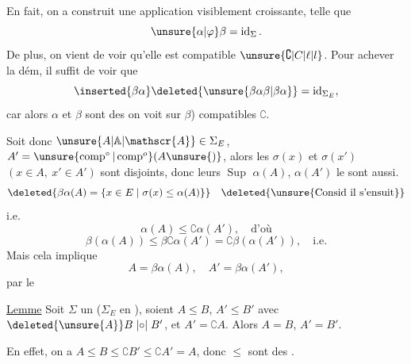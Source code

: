 En fait, on a  construit une application
visiblement croissante, telle que
\[
\unsure{\alpha|\varphi}\beta=\operatorname{id}_{\Sigma}.
\]
De plus, on vient de voir qu'elle est compatible  $\unsure{\complement|C|\ell|l}$. Pour achever la dém, il suffit de voir que
\[
\inserted{\beta\alpha}\deleted{\unsure{\beta\alpha\beta|\beta\alpha}}=\operatorname{id}_{\Sigma_E},
\]
car alors $\alpha$ et $\beta$ sont des   on voit sur $\beta$) compatibles  $\complement$.

Soit donc $\unsure{A|\mathbb{A}|\mathscr{A}}\in\Sigma_E$, $A'=\unsure{\operatorname{comp}^{\circ}|\operatorname{comp}^{o}}(A\unsure{)}$, alors les $\sigma(x)$ et $\sigma(x')$ $(x\in A,\ x'\in A')$ sont disjoints, donc leurs $\operatorname{Sup}$ $\alpha(A)$, $\alpha(A')$ le sont aussi. 
\[
\deleted{\beta\alpha(A)=\{x\in E\mid\sigma(x)\leq\alpha(A)\}}
\quad\deleted{\text{\unsure{Consid il s'ensuit}}}
\]
i.e.
\[
\alpha(A)\leq\complement\alpha(A'),\quad\text{d'où}
\]
\[
\beta(\alpha(A))\leq\beta\complement\alpha(A')=\complement\beta(\alpha(A')),\quad\text{i.e.}
\]
Mais cela implique
\[
A=\beta\alpha(A),\quad A'=\beta\alpha(A'),
\]
par le

\uline{Lemme} Soit $\Sigma$ un  ($\Sigma_E$ en ), soient $A\leq B$, $A'\leq B'$ avec $\deleted{\unsure{A}}B\mathrel{|{\circ}|}B'$, et $A'=\complement A$. Alors $A=B$, $A'=B'$.

En effet, on a $A\leq B\leq\complement B'\leq\complement A'=A$, donc  $\leq$ sont des .


